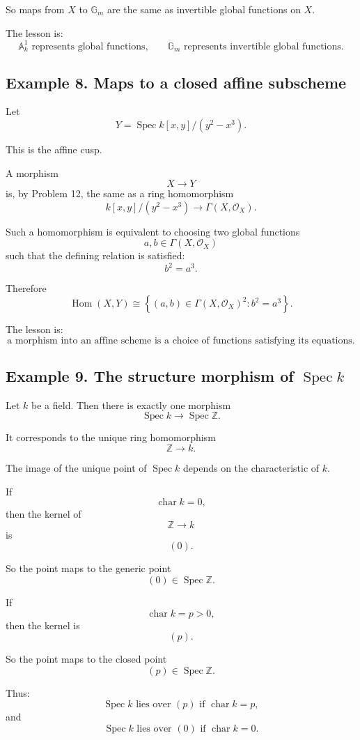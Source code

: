 \documentclass[12pt,a4paper]{article}
\DeclareMathOperator{\Hom}{Hom}
\newcommand{\Spec}{\operatorname{Spec}}
\theoremstyle{notespace}
\begin{document}
So maps from \(X\) to \(\mathbb G_m\) are the same as invertible global functions on \(X\).

The lesson is:
\[
\boxed{
	\mathbb A^1_k \text{ represents global functions,}
	\qquad
	\mathbb G_m \text{ represents invertible global functions.}
}
\]

\subsection{Example 8. Maps to a closed affine subscheme}

Let
\[
Y=\Spec k[x,y]/(y^2-x^3).
\]

This is the affine cusp.

A morphism
\[
X\to Y
\]
is, by Problem 12, the same as a ring homomorphism
\[
k[x,y]/(y^2-x^3)
\to
\Gamma(X,\mathcal O_X).
\]

Such a homomorphism is equivalent to choosing two global functions
\[
a,b\in\Gamma(X,\mathcal O_X)
\]
such that the defining relation is satisfied:
\[
b^2=a^3.
\]

Therefore
\[
\boxed{
	\Hom(X,Y)
	\cong
	\left\{
	(a,b)\in \Gamma(X,\mathcal O_X)^2:
	b^2=a^3
	\right\}.
}
\]

The lesson is:
\[
\boxed{
	\text{a morphism into an affine scheme is a choice of functions satisfying its equations.}
}
\]

\subsection{Example 9. The structure morphism of \(\Spec k\)}

Let \(k\) be a field. Then there is exactly one morphism
\[
\Spec k\to\Spec\mathbb Z.
\]

It corresponds to the unique ring homomorphism
\[
\mathbb Z\to k.
\]

The image of the unique point of \(\Spec k\) depends on the characteristic of \(k\).

If
\[
\operatorname{char}k=0,
\]
then the kernel of
\[
\mathbb Z\to k
\]
is
\[
(0).
\]

So the point maps to the generic point
\[
(0)\in\Spec\mathbb Z.
\]

If
\[
\operatorname{char}k=p>0,
\]
then the kernel is
\[
(p).
\]

So the point maps to the closed point
\[
(p)\in\Spec\mathbb Z.
\]

Thus:
\[
\boxed{
	\Spec k
	\text{ lies over }(p)\text{ if }\operatorname{char}k=p,
}
\]
and
\[
\boxed{
	\Spec k
	\text{ lies over }(0)\text{ if }\operatorname{char}k=0.
}
\]
\end{document}
